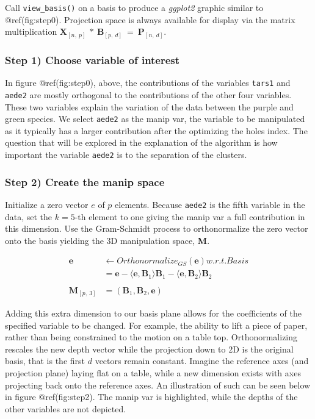 Call \texttt{view\_basis()} on a basis to produce a \emph{ggplot2} graphic similar to @ref(fig:step0). Projection space is always available for display via the matrix multiplication \(\textbf{X}_{[n,~p]} ~*~ \textbf{B}_{[p,~d]} ~=~ \textbf{P}_{[n,~d]}\).

\hypertarget{step-1-choose-variable-of-interest}{%
\subsubsection{Step 1) Choose variable of interest}\label{step-1-choose-variable-of-interest}}

In figure @ref(fig:step0), above, the contributions of the variables \texttt{tars1} and \texttt{aede2} are mostly orthogonal to the contributions of the other four variables. These two variables explain the variation of the data between the purple and green species. We select \texttt{aede2} as the manip var, the variable to be manipulated as it typically has a larger contribution after the optimizing the holes index. The question that will be explored in the explanation of the algorithm is how important the variable \texttt{aede2} is to the separation of the clusters.

\hypertarget{step-2-create-the-manip-space}{%
\subsubsection{Step 2) Create the manip space}\label{step-2-create-the-manip-space}}

Initialize a zero vector \(e\) of \(p\) elements. Because \texttt{aede2} is the fifth variable in the data, set the \(k=5\)-th element to one giving the manip var a full contribution in this dimension. Use the Gram-Schmidt process to orthonormalize the zero vector onto the basis yielding the 3D manipulation space, \textbf{M}.

\begin{align*}
  \textbf{e} &\leftarrow Orthonormalize_{GS}(\textbf{e}) w.r.t. Basis \\
  &= \textbf{e} - \langle \textbf{e},\textbf{B}_1 \rangle \textbf{B}_1 - \langle \textbf{e}, \textbf{B}_2 \rangle \textbf{B}_2 \\
  \\
  \textbf{M}_{[p,~3]} &= (\textbf{B}_1,\textbf{B}_2,\textbf{e})
\end{align*}

Adding this extra dimension to our basis plane allows for the coefficients of the specified variable to be changed. For example, the ability to lift a piece of paper, rather than being constrained to the motion on a table top. Orthonormalizing rescales the new depth vector while the projection down to 2D is the original basis, that is the first \(d\) vectors remain constant. Imagine the reference axes (and projection plane) laying flat on a table, while a new dimension exists with axes projecting back onto the reference axes. An illustration of such can be seen below in figure @ref(fig:step2). The manip var is highlighted, while the depths of the other variables are not depicted.

